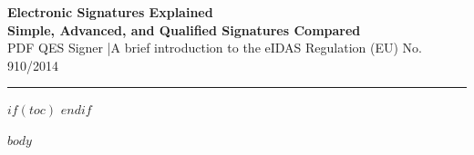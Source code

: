 \documentclass[a4paper,10pt]{article}
\begin{document}
\thispagestyle{fancy}

\begin{center}
  {\LARGE\bfseries\color{qesblue}
    Electronic Signatures Explained}\\[0.5cm]
  {\large\bfseries Simple, Advanced, and Qualified Signatures Compared}\\[0.3cm]
  {\small\color{gray}
    PDF QES Signer \enspace|\enspace A brief introduction to the eIDAS Regulation (EU) No.\,910/2014}
\end{center}
{\color{qesblue}\rule{\linewidth}{2pt}}
\vspace{0.6cm}

$if(toc)$
{
\hypersetup{linkcolor=qesblue}
\setcounter{tocdepth}{$toc-depth$}
\tableofcontents
\clearpage
}
$endif$

$body$
\end{document}
